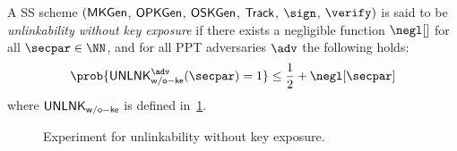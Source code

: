 \begin{definition}
A SS scheme $(\mathsf{MKGen}$, $\mathsf{OPKGen}$, $\mathsf{OSKGen}$, $\mathsf{Track}$, $\sign$, $\verify)$  is said to be \emph{unlinkability without key exposure} if there exists a negligible function $\negl[]$ for all $\secpar \in \NN$, and for all PPT adversaries $\adv$ the following holds:
\[ \prob{\unlinkwoke^\adv (\secpar)=1} \le \frac{1}{2} + \negl[\secpar]\]
where $\mathsf{UNLNK}_\mathsf{w/o-ke}$ is defined in~\cref{fig:experiment_unlink_without_key_exposure}.
\end{definition}

\begin{figure}[!t]
    \centering
    \begin{pchstack}[boxed]
    \begin{pcvstack}
    

    \end{pcvstack}

    \pchspace
    \begin{pcvstack}
        
        \pchspace
        
    \end{pcvstack}
    \end{pchstack}
    \caption{\small Experiment for unlinkability without key exposure.}
    \label{fig:experiment_unlink_without_key_exposure}
\end{figure}

